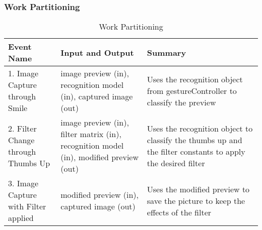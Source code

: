 \documentclass[12pt, titlepage]{article}
\begin{document}
\subsubsection{Work Partitioning}
\begin{table}[h!]
\begin{tabular}{| m{3cm} | m{6cm}| m{8cm} |}
\hline
\textbf{Event Name} &
  \textbf{Input and Output} &
  \textbf{Summary} \\ \hline
1. Image Capture through Smile &
  image preview (in), recognition model (in), captured image (out) &
  Uses the recognition object from gestureController to classify the preview \\ \hline
2. Filter Change through Thumbs Up &
  image preview (in), filter matrix (in), recognition model (in), modified preview (out) &
  Uses the recognition object to classify the thumbs up and the filter constants to apply the desired filter \\ \hline
3. Image Capture with Filter applied &
  modified preview (in), captured image (out) &
  Uses the modified preview to save the picture to keep the effects of the filter \\ \hline
\end{tabular}
\caption{Work Partitioning }
\end{table}

\end{document}

